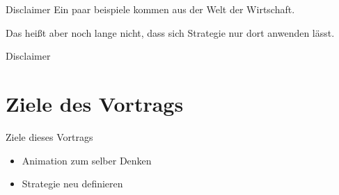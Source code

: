 

\ifonline
\begin{frame}[c]{Disclaimer}
    Ein paar beispiele kommen aus der Welt der Wirtschaft. \\ \pause

    \vfill

    Das heißt aber noch lange nicht, dass sich Strategie nur dort anwenden lässt.
\end{frame}
\else
\begin{frame}[standout]
    Disclaimer
\end{frame}
\fi


\section{Ziele des Vortrags}
\begin{frame}[c]{Ziele dieses Vortrags}
    \Large
    \begin{itemize}
        \item Animation zum selber Denken
        \item Strategie neu definieren
    \end{itemize}
\end{frame}

